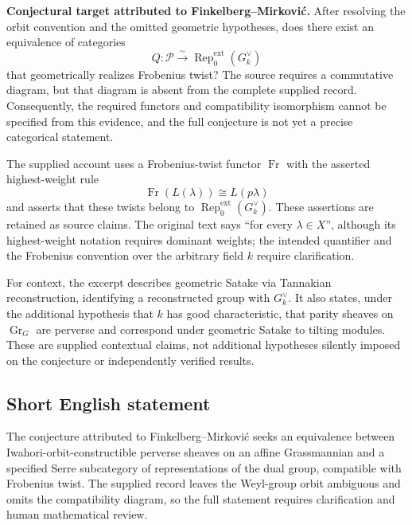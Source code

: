 \documentclass[11pt]{article}
\begin{document}
\textbf{Conjectural target attributed to Finkelberg--Mirkovi\'{c}.}
After resolving the orbit convention and the omitted geometric hypotheses, does there exist an equivalence of categories
\[
Q:\mathcal P\xrightarrow{\sim}
\operatorname{Rep}^{\mathrm{ext}}_0(G_k^\vee)
\]
that geometrically realizes Frobenius twist? The source requires a commutative diagram, but that diagram is absent from the complete supplied record. Consequently, the required functors and compatibility isomorphism cannot be specified from this evidence, and the full conjecture is not yet a precise categorical statement.

The supplied account uses a Frobenius-twist functor \(\operatorname{Fr}\) with the asserted highest-weight rule
\[
\operatorname{Fr}(L(\lambda))\cong L(p\lambda)
\]
and asserts that these twists belong to \(\operatorname{Rep}^{\mathrm{ext}}_0(G_k^\vee)\). These assertions are retained as source claims. The original text says ``for every \(\lambda\in X\)'', although its highest-weight notation requires dominant weights; the intended quantifier and the Frobenius convention over the arbitrary field \(k\) require clarification.

For context, the excerpt describes geometric Satake via Tannakian reconstruction, identifying a reconstructed group with \(G_k^\vee\). It also states, under the additional hypothesis that \(k\) has good characteristic, that parity sheaves on \(\operatorname{Gr}_G\) are perverse and correspond under geometric Satake to tilting modules. These are supplied contextual claims, not additional hypotheses silently imposed on the conjecture or independently verified results.
\subsection{Short English statement}
The conjecture attributed to Finkelberg--Mirkovi\'{c} seeks an equivalence between Iwahori-orbit-constructible perverse sheaves on an affine Grassmannian and a specified Serre subcategory of representations of the dual group, compatible with Frobenius twist. The supplied record leaves the Weyl-group orbit ambiguous and omits the compatibility diagram, so the full statement requires clarification and human mathematical review.
\end{document}
